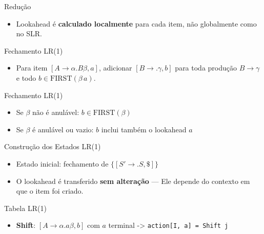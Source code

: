 \begin{frame}{Redução}

    \begin{itemize}

        \item
        Lookahead é \textbf{calculado localmente} para cada item, não
        globalmente como no SLR.
    \end{itemize}
\end{frame}

\begin{frame}{Fechamento LR(1)}

    \begin{itemize}

        \item
        Para item \([A \to \alpha . B \beta, a]\), adicionar
        \([B \to . \gamma, b]\) para toda produção \(B \to \gamma\) e todo
        \(b \in \mathrm{FIRST}(\beta\, a)\).
    \end{itemize}
\end{frame}

\begin{frame}{Fechamento LR(1)}

    \begin{itemize}

        \item
        Se \(\beta\) não é anulável: \(b \in \mathrm{FIRST}(\beta)\)
        \item
        Se \(\beta\) é anulável ou vazio: \(b\) inclui também o lookahead
        \(a\)
    \end{itemize}
\end{frame}

\begin{frame}{Construção dos Estados LR(1)}

    \begin{itemize}
        \item
        Estado inicial: fechamento de \(\{[S' \to . S, \$]\}\)
        \item
        O lookahead é transferido \textbf{sem alteração} --- Ele depende do
        contexto em que o item foi criado.
    \end{itemize}
\end{frame}

\begin{frame}[fragile]{Tabela LR(1)}

    \begin{itemize}

        \item
        \textbf{Shift}: \([A \to \alpha . a \beta, b]\) com \(a\) terminal ->
        \texttt{action[I, a] = Shift j}
    \end{itemize}
\end{frame}

